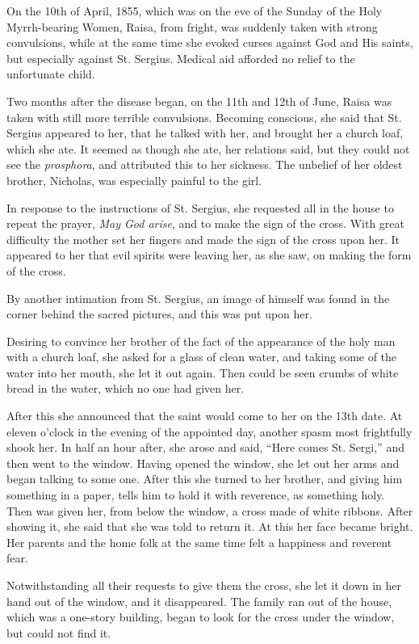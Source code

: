 On the 10th of April, 1855, which was on the eve of the Sunday of the Holy Myrrh-bearing Women, Raisa, from fright, was suddenly taken with strong convulsions, while at the same time she evoked curses against God and His saints, but especially against St. Sergius. Medical aid afforded no relief to the unfortunate child.

Two months after the disease began, on the 11th and 12th of June, Raisa was taken with still more terrible convulsions. Becoming conscious, she said that St. Sergius appeared to her, that he talked with her, and brought her a church loaf, which she ate. It seemed as though she ate, her relations said, but they could not see the \textit{prosphora}, and attributed this to her sickness. The unbelief of her oldest brother, Nicholas, was especially painful to the girl.

In response to the instructions of St. Sergius, she requested all in the house to repeat the prayer, \textit{May God arise}, and to make the sign of the cross. With great difficulty the mother set her fingers and made the sign of the cross upon her. It appeared to her that evil spirits were leaving her, as she saw, on making the form of the cross.

By another intimation from St. Sergius, an image of himself was found in the corner behind the sacred pictures, and this was put upon her.

Desiring to convince her brother of the fact of the appearance of the holy man with a church loaf, she asked for a glass of clean water, and taking some of the water into her mouth, she let it out again. Then could be seen crumbs of white bread in the water, which no one had given her.

After this she announced that the saint would come to her on the 13th date. At eleven o'clock in the evening of the appointed day, another spasm most frightfully shook her. In half an hour after, she arose and said, ``Here comes St. Sergi,'' and then went to the window. Having opened the window, she let out her arms and began talking to some one. After this she turned to her brother, and giving him something in a paper, tells him to hold it with reverence, as something holy. Then was given her, from below the window, a cross made of white ribbons. After showing it, she said that she was told to return it. At this her face became bright. Her parents and the home folk at the same time felt a happiness and reverent fear.

Notwithstanding all their requests to give them the cross, she let it down in her hand out of the window, and it disappeared. The family ran out of the house, which was a one-story building, began to look for the cross under the window, but could not find it.


